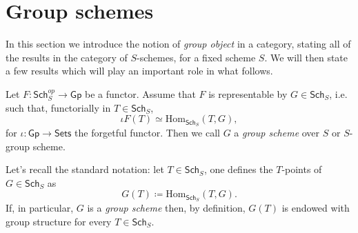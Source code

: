 \documentclass[../Main]{subfiles}
\begin{document}
\section{Group schemes}
In this section we introduce the notion of {\em group object}
in a category, stating all of the results in the category
of $S$-schemes, for a fixed scheme $S$.
We will then state a few results which will play an important role
in what follows.


\begin{defn}
	Let $F\colon \mathsf{Sch}_S^{op} \to \mathsf{Gp}$ be a functor.
	Assume that $F$ is representable by $G \in \mathsf{Sch}_{ S }$, i.e. such that, 
	functorially in $T \in \mathsf{Sch}_{ S }$,
	\begin{equation*}
		\iota F(T) \simeq \mathrm{Hom}_{\mathsf{Sch}_S} \left( T, G \right)
	,\end{equation*} 
	for $\iota\colon \mathsf{Gp} \to \mathsf{Sets}$ the forgetful functor.
	Then we call $G$ a {\em group scheme} over $S$
	or $S$-group scheme.
\end{defn}


\begin{rem}
	Let's recall the standard notation: let $T \in \mathsf{Sch}_{ S }$, one defines
	the $T$-points of $G \in \mathsf{Sch}_{ S }$ as
	\begin{equation*}
		G(T) \coloneqq \mathrm{Hom}_{\mathsf{Sch}_{ S }} \left( T, G \right)
	.\end{equation*} 
	If, in particular, $G$ is a {\em group scheme} then, by definition,
	$G(T)$ is endowed with group structure for every $T \in \mathsf{Sch}_{ S }$.
\end{rem}
\end{document}
